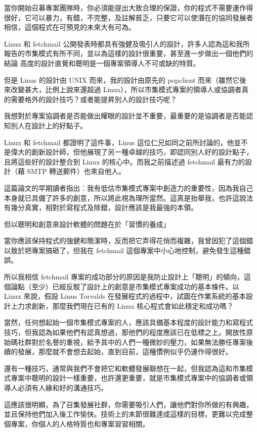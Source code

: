 \documentclass[10pt, b5paper]{book}
\makeatletter
\newcommand*{\shifttext}[2]{%
  \settowidth{\@tempdima}{#2}%
  \makebox[\@tempdima]{\hspace*{#1}#2}%
}
\makeatother
\begin{document}
當你開始召募專案團隊時，你必須能提出大致合理的保證，你的程式不需要運作得很好，它可以暴力，有錯，不完整，及註解貧乏，只要它可以使潛在的協同發展者相信，這個程式在可預見的未來大有可為。

Linux 和 fetchmail
公開發表時都具有強健及吸引人的設計，許多人認為這和我所報告的市集模式有所不同，並以為這樣的設計很重要，甚至進一步做出一個他們的結論
\shifttext{1pt}{---}\shifttext{-1pt}{---} 高度的設計直覺和聰明是一個專案領導人不可或缺的特質。

但是 Linus 的設計由 UNIX 而來，我的設計由原先的 popclient
而來（雖然它後來改變甚大，比例上說來還超過
Linux），所以市集模式專案的領導人或協調者真的需要格外的設計技巧？或者能提昇別人的設計技巧呢？

我想對於專案協調者是否能做出耀眼的設計並不重要，最重要的是協調者是否能認知別人在設計上的好點子。

Linux 和 fetchmail 都證明了這件事，Linus
這位仁兄如同之前所討論的，他並不是偉大的創新設計師，但他展現了另一種卓越的技巧，即認同別人好的設計點子，且將這些好的設計整合到
Linux 的核心中。而我之前描述過 fetchmail 最有力的設計（藉 SMTP
轉送郵件）也來自他人。

這篇論文的早期讀者指出︰我有低估市集模式專案中創造力的重要性，因為我自己本身就已具備了許多的創意，所以將此視為理所當然。這真是抬舉我，也許這說法有幾分真實，相對於寫程式及除錯，設計應該是我最強的本領。

但以聰明和創意來設計軟體的問題在於「習慣的養成」 \shifttext{1pt}{---}\shifttext{-1pt}{---}
當你應該保持程式的強健和簡潔時，反而把它弄得花俏而複雜，我曾因犯了這個錯以致於把專案搞砸了，但我在
fetchmail 這個專案中小心地控制，避免發生這種錯誤。

所以我相信 fetchmail
專案的成功部分的原因是我防止設計上「聰明」的傾向，這個論點（至少）已經反駁了設計上的創意是市集模式專案成功的基本條件。以
Linux 來說，假設 Linus Torvalds
在發展程式的過程中，試圖在作業系統的基本設計上力求創新，那麼我們現在已有的
Linux 核心程式會如此穩定和成功嗎？

當然，任何想起始一個市集模式專案的人，應該具備基本程度的設計能力和寫程式技巧，但我認為如果他們有認真想過，那他們的程度應該已在低標之上。開放性原始碼社群對於名譽的重視，給予其中的人們一種微妙的壓力，如果無法勝任專案後續的發展，那麼就不會想去起始，直到目前，這種慣例似乎仍運作得很好。

還有一種技巧，通常與我們不會把它和軟體發展聯想在一起，但我認為這和市集模式專案中聰明的設計一樣重要，也許還更重要，就是市集模式專案中的協調者或領導人必須有人緣和好的溝通技巧。

這應該很明顯，為了召集發展社群，你需要吸引人們，讓他們對你所做的有興趣，並且保持他們加入後工作愉快。技術上的末節很難達成這樣的目標，更難以完成整個專案，你個人的人格特質也和專案習習相關。
\end{document}
